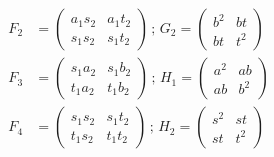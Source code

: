 \documentclass[12pt]{article}
\begin{document}
\begin{align}
F_2 &= \left( \begin{matrix} a_1 s_2 & a_1 t_2 \\ s_1 s_2 & s_1 t_2 \end{matrix} \right)\,;\,G_2 = \left( \begin{matrix} b^2 & bt \\ bt & t^2 \end{matrix} \right) \\
F_3 &= \left( \begin{matrix} s_1 a_2 & s_1 b_2 \\ t_1 a_2 & t_1 b_2 \end{matrix} \right)\,;\,H_1 = \left( \begin{matrix} a^2 & ab \\ ab & b^2 \end{matrix} \right) \\
F_4 &= \left( \begin{matrix} s_1 s_2 & s_1 t_2 \\ t_1 s_2 & t_1 t_2 \end{matrix} \right)\,;\,H_2 = \left( \begin{matrix} s^2 & st \\ st & t^2 \end{matrix} \right)
\end{align}
\end{document}

